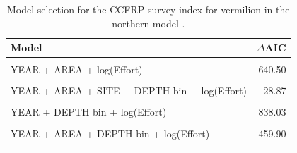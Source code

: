 \documentclass[
  english,
  a4paper,
]{article}
\begin{document}
\FloatBarrier

\begin{table}

\caption{\label{tab:tab-model-select-ccfrp}Model selection for the CCFRP survey index for vermilion in the northern model .}
\centering
\begin{tabular}[t]{lr}
\toprule
Model & $\Delta$AIC\\
\midrule
\cellcolor{gray!6}{1 + log(Effort)} & \cellcolor{gray!6}{1241.97}\\
YEAR + AREA + log(Effort) & 640.50\\
\cellcolor{gray!6}{YEAR + AREA + SITE + log(Effort)} & \cellcolor{gray!6}{157.27}\\
YEAR + AREA + SITE + DEPTH bin + log(Effort) & 28.87\\
\cellcolor{gray!6}{YEAR + SITE + log(Effort)} & \cellcolor{gray!6}{620.91}\\
\addlinespace
YEAR + DEPTH bin + log(Effort) & 838.03\\
\cellcolor{gray!6}{YEAR + SITE + DEPTH bin + log(Effort)} & \cellcolor{gray!6}{450.84}\\
YEAR + AREA + DEPTH bin + log(Effort) & 459.90\\
\cellcolor{gray!6}{YEAR + AREA + SITE + DEPTH bin + YEAR:SITE + log(Effort)} & \cellcolor{gray!6}{0.00}\\
\bottomrule
\end{tabular}
\end{table}

\FloatBarrier
\end{document}
